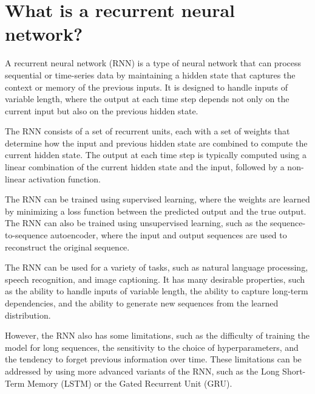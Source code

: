 \section{What is a recurrent neural network?}
A recurrent neural network (RNN) is a type of neural network that can process sequential or time-series data by maintaining a hidden state that captures the context or memory of the previous inputs. It is designed to handle inputs of variable length, where the output at each time step depends not only on the current input but also on the previous hidden state.

The RNN consists of a set of recurrent units, each with a set of weights that determine how the input and previous hidden state are combined to compute the current hidden state. The output at each time step is typically computed using a linear combination of the current hidden state and the input, followed by a non-linear activation function.

The RNN can be trained using supervised learning, where the weights are learned by minimizing a loss function between the predicted output and the true output. The RNN can also be trained using unsupervised learning, such as the sequence-to-sequence autoencoder, where the input and output sequences are used to reconstruct the original sequence.

The RNN can be used for a variety of tasks, such as natural language processing, speech recognition, and image captioning. It has many desirable properties, such as the ability to handle inputs of variable length, the ability to capture long-term dependencies, and the ability to generate new sequences from the learned distribution.

However, the RNN also has some limitations, such as the difficulty of training the model for long sequences, the sensitivity to the choice of hyperparameters, and the tendency to forget previous information over time. These limitations can be addressed by using more advanced variants of the RNN, such as the Long Short-Term Memory (LSTM) or the Gated Recurrent Unit (GRU).

